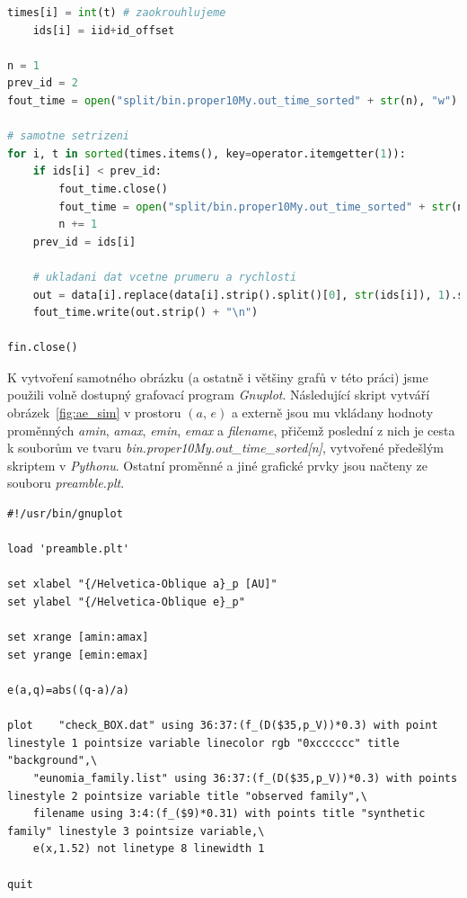 \documentclass[A4paper, 12pt, oneside]{book}
\begin{document}
\begin{appendices}
\begin{lstlisting}[language=Python]
    times[i] = int(t) # zaokrouhlujeme
    ids[i] = iid+id_offset

n = 1
prev_id = 2
fout_time = open("split/bin.proper10My.out_time_sorted" + str(n), "w")

# samotne setrizeni
for i, t in sorted(times.items(), key=operator.itemgetter(1)):
    if ids[i] < prev_id:
        fout_time.close()
        fout_time = open("split/bin.proper10My.out_time_sorted" + str(n), "w")
        n += 1
    prev_id = ids[i]

    # ukladani dat vcetne prumeru a rychlosti
    out = data[i].replace(data[i].strip().split()[0], str(ids[i]), 1).strip() + "   " + d[ids[i]].strip() + " " + v[ids[i]].strip()
    fout_time.write(out.strip() + "\n")

fin.close()
	\end{lstlisting}
	
	K vytvoření samotného obrázku (a ostatně i většiny grafů v této práci) jsme použili volně dostupný grafovací program \textit{Gnuplot}. Následující skript vytváří obrázek~\ref{fig:ae_sim} v prostoru $(a,\,e)$ a externě jsou mu vkládany hodnoty proměnných \textit{amin}, \textit{amax}, \textit{emin}, \textit{emax} a \textit{filename}, přičemž poslední z nich je cesta k souborům ve tvaru \textit{bin.proper10My.out\_time\_sorted[n]}, vytvořené předešlým skriptem v \textit{Pythonu}. Ostatní proměnné a jiné grafické prvky jsou načteny ze souboru \textit{preamble.plt}.

\begin{lstlisting}[language=Gnuplot]
#!/usr/bin/gnuplot

load 'preamble.plt'

set xlabel "{/Helvetica-Oblique a}_p [AU]" 
set ylabel "{/Helvetica-Oblique e}_p" 

set xrange [amin:amax]
set yrange [emin:emax]

e(a,q)=abs((q-a)/a)

plot 	"check_BOX.dat" using 36:37:(f_(D($35,p_V))*0.3) with point linestyle 1 pointsize variable linecolor rgb "0xcccccc" title "background",\
 	"eunomia_family.list" using 36:37:(f_(D($35,p_V))*0.3) with points linestyle 2 pointsize variable title "observed family",\
	filename using 3:4:(f_($9)*0.31) with points title "synthetic family" linestyle 3 pointsize variable,\
	e(x,1.52) not linetype 8 linewidth 1

quit
\end{lstlisting}

\end{appendices}
\end{document}
